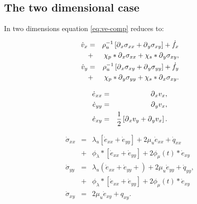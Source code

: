\documentclass[11pt]{article}
\begin{document}
\subsection{The two dimensional case}
In  two dimensions equation \ref{eq:ve-comp} reduces to:

\begin{eqnarray}
  \dot{v}_x & = & \rho^{-1}_u\left[\mbox{$\partial$}_x \sigma_{xx} 
                  +\mbox{$\partial$}_y \sigma_{xy}\right] + \dot{f}_x        \nonumber \\
            & + &  \chi_{p}*\mbox{$\partial$}_x \sigma_{xx}  
                  +\chi_{s}*\mbox{$\partial$}_y \sigma_{xy},               \nonumber \\
  \dot{v}_y & = & \rho^{-1}_u\left[\mbox{$\partial$}_x \sigma_{xy} 
                  +\mbox{$\partial$}_y \sigma_{yy}\right] + \dot{f}_y        \nonumber \\
            & + &  \chi_{p}*\mbox{$\partial$}_y \sigma_{yy}  
                  +\chi_{s}*\mbox{$\partial$}_x \sigma_{xy}.               
\end{eqnarray}

\begin{eqnarray}
  \dot{e}_{xx} & = & \mbox{$\partial$}_x v_x,                                  \nonumber \\
  \dot{e}_{yy} & = & \mbox{$\partial$}_y v_x,                                  \nonumber \\
  \dot{e}_{xy} & = & \frac{1}{2}\left[\mbox{$\partial$}_x v_y+\mbox{$\partial$}_y v_x\right].
\end{eqnarray}

\begin{eqnarray}
  \dot{\sigma}_{xx} 
     & = & \lambda_u \left [\dot{e}_{xx} 
                 + \dot{e}_{yy} \right]
                 + 2\mu_u \dot{e}_{xx} +\dot{q}_{xx}  \nonumber\\          
     & + & \phi_{\lambda}*[\dot{e}_{xx}+\dot{e}_{yy}]
                + 2\phi_{\mu}(t)*\dot{e}_{xy}         \nonumber\\ 
  \dot{\sigma}_{yy} 
     & = & \lambda_u \left (\dot{e}_{xx} 
                 +\dot{e}_{yy} + \right)
                 + 2\mu_u \dot{e}_{yy} +\dot{q}_{yy},           \nonumber\\
     & + & \phi_{\lambda}*[\dot{e}_{xx}+\dot{e}_{yy}]
                + 2\phi_{\mu}(t)*\dot{e}_{xy}                   \nonumber\\ 
  \dot{\sigma}_{xy} 
    & = & 2\mu_u \dot{e}_{xy} +q_{xy}.                          
\end{eqnarray}
\end{document}
